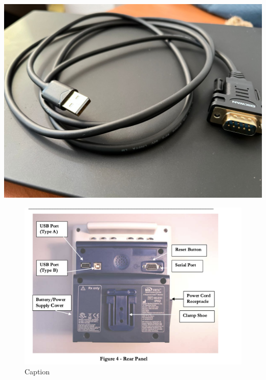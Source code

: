 \documentclass{article}
\begin{document}
\begin{enumerate}
	\includegraphics*[scale=0.12]{img/rs232_macho_a_usb.jpeg}

\end{enumerate}










\newpage

\begin{figure}
	\centering
    \includegraphics[scale=0.5]{img/bis_rear_panel.png}
    \caption{Caption}
\end{figure}
\end{document}
